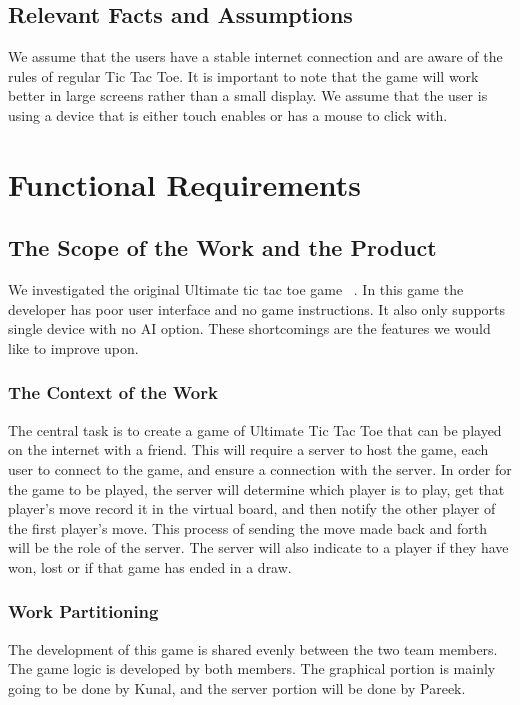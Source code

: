 \documentclass[12pt, titlepage]{article}
\begin{document}
\subsection{Relevant Facts and Assumptions}
We assume that the users have a stable internet connection and are aware of the
rules of regular Tic Tac Toe. It is important to note that the game will work
better in large screens rather than a small display. We assume that the user is
using a device that is either touch enables or has a mouse to click with.

\section{Functional Requirements}

\subsection{The Scope of the Work and the Product}

We investigated the original Ultimate tic tac toe game ~\citep{githubREF}. In
this  game the developer has poor user interface and no game instructions. It
also only supports single device with no AI option. These shortcomings are
the features we would like to improve upon.

\subsubsection{The Context of the Work}
The central task is to create a game of Ultimate Tic Tac Toe that can be played
on the internet with a friend. This will require a server to host the game, each
user to connect to the game, and ensure a connection with the server. In order
for the game to be played, the server will determine which player is to play,
get that player's move record it in the virtual board, and then notify the 
other player of the first player's move. This process of sending the move made 
back and forth will be the role of the server. The server will also indicate to
a player if they have won, lost or if that game has ended in a draw.

\subsubsection{Work Partitioning}
The development of this game is shared evenly between the two team members. The
game logic is developed by both members. The graphical portion is mainly going
to be done by Kunal, and the server portion will be done by Pareek.
\end{document}

